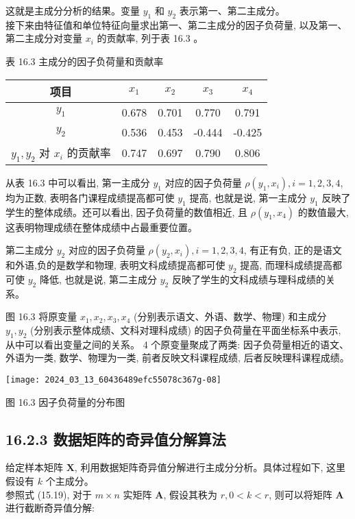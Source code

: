 \documentclass[10pt]{article}
\begin{document}
这就是主成分分析的结果。变量 $y_{1}$ 和 $y_{2}$ 表示第一、第二主成分。\\
接下来由特征值和单位特征向量求出第一、第二主成分的因子负荷量, 以及第一、第二主成分对变量 $x_{i}$ 的贡献率, 列于表 16.3 。

表 16.3 主成分的因子负荷量和贡献率

\begin{center}
\begin{tabular}{ccccc}
\hline
项目 & $x_{1}$ & $x_{2}$ & $x_{3}$ & $x_{4}$ \\
\hline
$y_{1}$ & 0.678 & 0.701 & 0.770 & 0.791 \\
$y_{2}$ & 0.536 & 0.453 & -0.444 & -0.425 \\
$y_{1}, y_{2}$ 对 $x_{i}$ 的贡献率 & 0.747 & 0.697 & 0.790 & 0.806 \\
\hline
\end{tabular}
\end{center}

从表 16.3 中可以看出, 第一主成分 $y_{1}$ 对应的因子负荷量 $\rho\left(y_{1}, x_{i}\right), i=1,2,3,4$, 均为正数, 表明各门课程成绩提高都可使 $y_{1}$ 提高, 也就是说, 第一主成分 $y_{1}$ 反映了学生的整体成绩。还可以看出, 因子负荷量的数值相近, 且 $\rho\left(y_{1}, x_{4}\right)$ 的数值最大, 这表明物理成绩在整体成绩中占最重要位置。

第二主成分 $y_{2}$ 对应的因子负荷量 $\rho\left(y_{2}, x_{i}\right), i=1,2,3,4$, 有正有负, 正的是语文和外语,负的是数学和物理, 表明文科成绩提高都可使 $y_{2}$ 提高, 而理科成绩提高都可使 $y_{2}$ 降低, 也就是说, 第二主成分 $y_{2}$ 反映了学生的文科成绩与理科成绩的关系。

图 16.3 将原变量 $x_{1}, x_{2}, x_{3}, x_{4}$ (分别表示语文、外语、数学、物理) 和主成分 $y_{1}, y_{2}$ (分别表示整体成绩、文科对理科成绩) 的因子负荷量在平面坐标系中表示, 从中可以看出变量之间的关系。 4 个原变量聚成了两类: 因子负荷量相近的语文、外语为一类, 数学、物理为一类, 前者反映文科课程成绩, 后者反映理科课程成绩。

\begin{center}
\texttt{[image: 2024\_03\_13\_60436489efc55078c367g-08]}
\end{center}

图 16.3 因子负荷量的分布图

\subsection*{16.2.3 数据矩阵的奇异值分解算法}
给定样本矩阵 $\boldsymbol{X}$, 利用数据矩阵奇异值分解进行主成分分析。具体过程如下, 这里假设有 $k$ 个主成分。\\
参照式 (15.19), 对于 $m \times n$ 实矩阵 $\boldsymbol{A}$, 假设其秩为 $r, 0<k<r$, 则可以将矩阵 $\boldsymbol{A}$ 进行截断奇异值分解:
\end{document}
